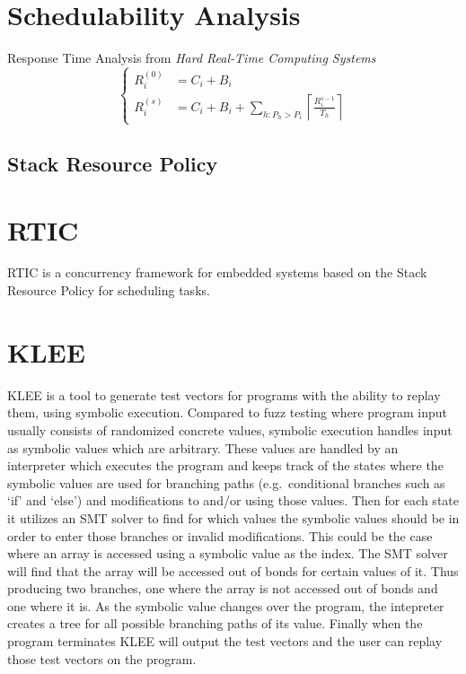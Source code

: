 \section{Schedulability Analysis}
Response Time Analysis from \textit{Hard Real-Time Computing Systems}\cite{hardrealtimecomputingsystems}
\begin{equation}
    \begin{cases}
        R_{i}^{(0)} &= C_i + B_i \\
        R_{i}^{(s)} &= C_i + B_i + \sum\limits_{h: P_h > P_i} \left\lceil \frac{R_{i}^{s-1}}{T_h} \right\rceil
    \end{cases}
\end{equation}
\subsection{Stack Resource Policy}


\section{RTIC}
RTIC\cite{rticwebsite} is a concurrency framework for embedded systems based on the Stack Resource Policy\cite{srp} for scheduling tasks. 

\section{KLEE}
KLEE\cite{kleepaper} is a tool to generate test vectors for programs with the ability to replay them, using symbolic execution. Compared to fuzz testing where program input usually consists of randomized concrete values, symbolic execution handles input as symbolic values which are arbitrary. These values are handled by an interpreter which executes the program and keeps track of the states where the symbolic values are used for branching paths (e.g.\ conditional branches such as `if' and `else') and modifications to and/or using those values. Then for each state it utilizes an SMT solver to find for which values the symbolic values should be in order to enter those branches or invalid modifications. This could be the case where an array is accessed using a symbolic value as the index. The SMT solver will find that the array will be accessed out of bonds for certain values of it. Thus producing two branches, one where the array is not accessed out of bonds and one where it is. As the symbolic value changes over the program, the intepreter creates a tree for all possible branching paths of its value. Finally when the program terminates KLEE will output the test vectors and the user can replay those test vectors on the program.

